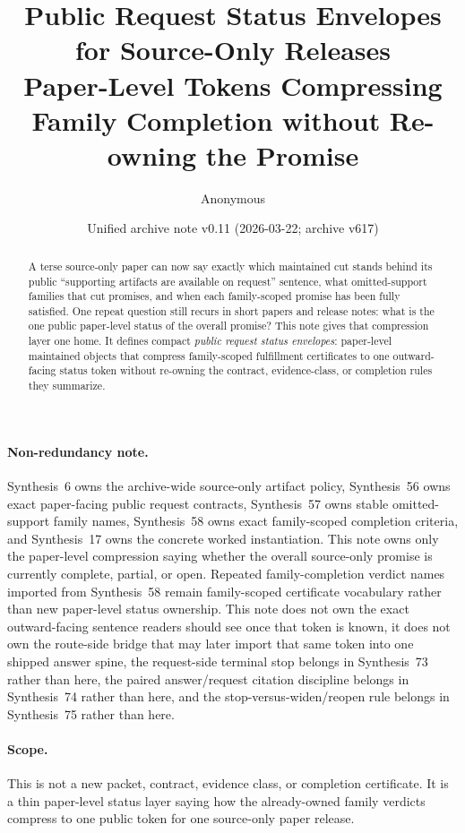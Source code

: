 \documentclass[11pt]{article}
\title{Public Request Status Envelopes for Source-Only Releases\\\large Paper-Level Tokens Compressing Family Completion without Re-owning the Promise}
\author{Anonymous}
\date{Unified archive note v0.11 (2026-03-22; archive v617)}
\begin{document}
\maketitle

\begin{abstract}
A terse source-only paper can now say exactly which maintained cut stands behind its public ``supporting artifacts are available on request'' sentence, what omitted-support families that cut promises, and when each family-scoped promise has been fully satisfied. One repeat question still recurs in short papers and release notes: what is the one public paper-level status of the overall promise? This note gives that compression layer one home. It defines compact \emph{public request status envelopes}: paper-level maintained objects that compress family-scoped fulfillment certificates to one outward-facing status token without re-owning the contract, evidence-class, or completion rules they summarize.
\end{abstract}

\paragraph{Non-redundancy note.}
Synthesis~6 owns the archive-wide source-only artifact policy, Synthesis~56 owns exact paper-facing public request contracts, Synthesis~57 owns stable omitted-support family names, Synthesis~58 owns exact family-scoped completion criteria, and Synthesis~17 owns the concrete worked instantiation.\cite{series:artifactpolicy,series:publicrequestcontracts,series:requestableevidenceclasses,series:requestfulfillmentcertificates,series:workedexample}
This note owns only the paper-level compression saying whether the overall source-only promise is currently complete, partial, or open. Repeated family-completion verdict names imported from Synthesis~58 remain family-scoped certificate vocabulary rather than new paper-level status ownership. This note does not own the exact outward-facing sentence readers should see once that token is known, it does not own the route-side bridge that may later import that same token into one shipped answer spine, the request-side terminal stop belongs in Synthesis~73 rather than here, the paired answer/request citation discipline belongs in Synthesis~74 rather than here, and the stop-versus-widen/reopen rule belongs in Synthesis~75 rather than here.

\paragraph{Scope.}
This is not a new packet, contract, evidence class, or completion certificate.
It is a thin paper-level status layer saying how the already-owned family verdicts compress to one public token for one source-only paper release.
\end{document}
